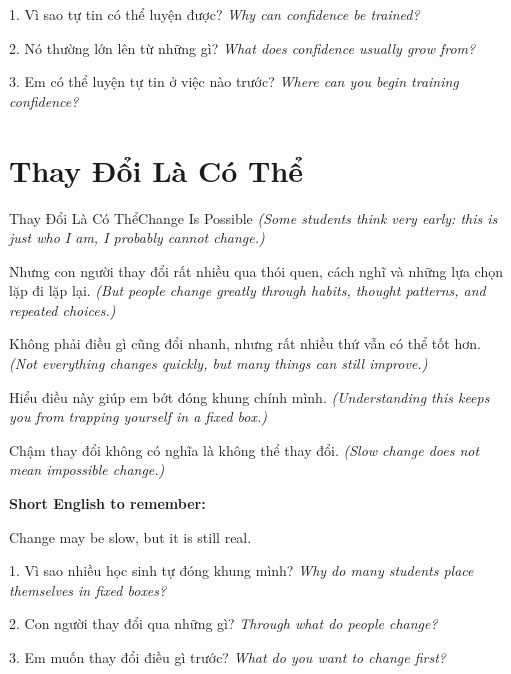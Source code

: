 \begin{tuhocnhanh}
1. Vì sao tự tin có thể luyện được? \textit{Why can confidence be trained?}

2. Nó thường lớn lên từ những gì? \textit{What does confidence usually grow from?}

3. Em có thể luyện tự tin ở việc nào trước? \textit{Where can you begin training confidence?}
\end{tuhocnhanh}
\ngancach

\section{Thay Đổi Là Có Thể}
\begin{truyen}{Thay Đổi Là Có Thể}{Change Is Possible}
\textit{(Some students think very early: this is just who I am, I probably cannot change.)}

Nhưng con người thay đổi rất nhiều qua thói quen, cách nghĩ và những lựa chọn lặp đi lặp lại.
\textit{(But people change greatly through habits, thought patterns, and repeated choices.)}

Không phải điều gì cũng đổi nhanh, nhưng rất nhiều thứ vẫn có thể tốt hơn.
\textit{(Not everything changes quickly, but many things can still improve.)}

Hiểu điều này giúp em bớt đóng khung chính mình.
\textit{(Understanding this keeps you from trapping yourself in a fixed box.)}
\end{truyen}

\begin{baihoc}
Chậm thay đổi không có nghĩa là không thể thay đổi.
\textit{(Slow change does not mean impossible change.)}
\end{baihoc}

\begin{ghinhoanh}
\textbf{Short English to remember:}

Change may be slow, but it is still real.

\end{ghinhoanh}

\begin{tuhocnhanh}
1. Vì sao nhiều học sinh tự đóng khung mình? \textit{Why do many students place themselves in fixed boxes?}

2. Con người thay đổi qua những gì? \textit{Through what do people change?}

3. Em muốn thay đổi điều gì trước? \textit{What do you want to change first?}
\end{tuhocnhanh}
\ngancach

